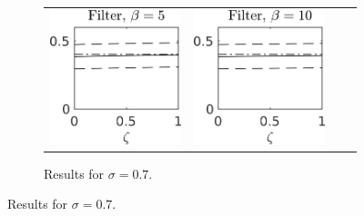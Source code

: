 \documentclass[10pt]{article}
\begin{document}
\begin{figure}[t]
\begin{subfigure}{\linewidth}
\begin{tabular}{cccc}
			\includegraphics[]{Figures/A_filt_s7_b5.png} & \includegraphics[]{Figures/A_filt_s7_b10.png}
		\end{tabular}	
	\caption{Results for $\sigma = 0.7$.}
	\end{subfigure}


\end{figure}
\end{document}
